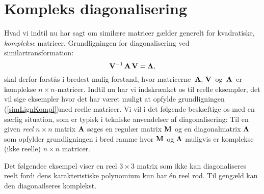 \section{Kompleks diagonalisering}

Hvad vi indtil nu har sagt om similære matricer gælder generelt for kvadratiske, \textit{komplekse} matricer. Grundligningen for diagonalisering ved similartransformation: 
\begin{equation*}\label{simLignKompl}
\mathbf{V}^{-1}\,\mathbf{A}\,\mathbf{V}=\bm{\Lambda},
\end{equation*}
skal derfor forstås i bredest mulig forstand, hvor matricerne $\,\mathbf{A},\,\mathbf{V}\,$ og $\,\bm{\Lambda}\,$ er komplekse $n\times n$-matricer. Indtil nu har vi indskrænket os til reelle eksempler, det vil sige eksempler hvor det har været muligt at opfylde grundligningen (\ref{simLignKompl})med reelle matricer. Vi vil i det følgende beskæftige os med en særlig situation, som er typisk i tekniske anvendelser af diagonalisering: Til en given \textit{reel} $n\times n$ matrix $\mathbf{A}$ søges en regulær matrix $\mathbf{M}$ og en diagonalmatrix $\bm{\Lambda}$ som opfylder grundligningen i bred ramme hvor $\mathbf{M}$ og $\bm{\Lambda}$ muligvis er komplekse (ikke reelle) $n\times n$ matricer.\bs

Det følgendee eksempel viser en reel $3 \times 3$ matrix som ikke kan diagonaliseres reelt fordi dens karakteristiske polynomium kun har én reel rod. Til gengæld kan den diagonailseres komplekst. 

